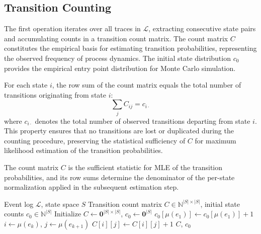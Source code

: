 \subsection{Transition Counting}
\label{sec:s3-counting}

The first operation iterates over all traces in $\mathcal{L}$, extracting
consecutive state pairs and accumulating counts in a transition count
matrix. The count matrix $C$ constitutes the empirical basis for
estimating transition probabilities, representing the observed frequency
of process dynamics. The initial state distribution $c_0$ provides the
empirical entry point distribution for Monte Carlo simulation.

\begin{property}
\label{prop:count-consistency}
For each state $i$, the row sum of the count matrix equals the total
number of transitions originating from state $i$:
\begin{equation}
\sum_{j} C_{ij} = c_{i \cdot}
\label{eq:count-consistency}
\end{equation}
where $c_{i \cdot}$ denotes the total number of observed transitions
departing from state $i$. This property ensures that no transitions are
lost or duplicated during the counting procedure, preserving the
statistical sufficiency of $C$ for maximum likelihood estimation of the
transition probabilities.
\end{property}

The count matrix $C$ is the sufficient statistic for MLE of the transition
probabilities, and its row sums determine the denominator of the
per-state normalization applied in the subsequent estimation step.

\begin{algorithm}[htbp]
\caption{Transition Count Extraction}
\label{alg:counting}
\begin{algorithmic}[1]
\REQUIRE Event log $\mathcal{L}$, state space $S$
\ENSURE Transition count matrix $C \in \mathbb{N}^{|S| \times |S|}$, 
    initial state counts $c_0 \in \mathbb{N}^{|S|}$
\STATE Initialize $C \gets \mathbf{0}^{|S| \times |S|}$, 
    $c_0 \gets \mathbf{0}^{|S|}$
    \STATE $c_0[\mu(e_1)] \gets c_0[\mu(e_1)] + 1$
        \STATE $i \gets \mu(e_k)$, \quad $j \gets \mu(e_{k+1})$
        \STATE $C[i][j] \gets C[i][j] + 1$
    \ENDFOR
\ENDFOR
\RETURN $C$, $c_0$
\end{algorithmic}
\end{algorithm}


